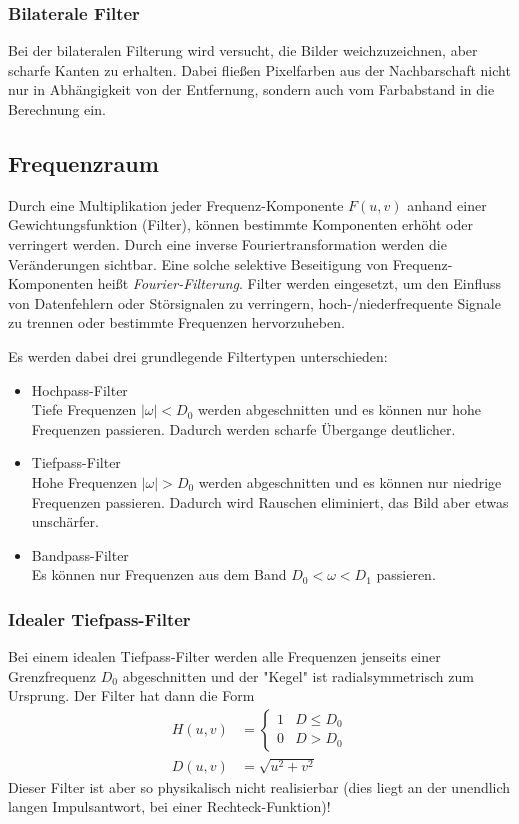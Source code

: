 	\subsubsection{Bilaterale Filter}
		Bei der bilateralen Filterung wird versucht, die Bilder weichzuzeichnen, aber scharfe Kanten zu erhalten. Dabei fließen Pixelfarben aus der Nachbarschaft nicht nur in Abhängigkeit von der Entfernung, sondern auch vom Farbabstand in die Berechnung ein.

	\subsection{Frequenzraum}
		Durch eine Multiplikation jeder Frequenz-Komponente \( F(u, v) \) anhand einer Gewichtungsfunktion (Filter), können bestimmte Komponenten erhöht oder verringert werden. Durch eine inverse Fouriertransformation werden die Veränderungen sichtbar. Eine solche selektive Beseitigung von Frequenz-Komponenten heißt \emph{Fourier-Filterung}. Filter werden \bspw eingesetzt, um den Einfluss von Datenfehlern oder Störsignalen zu verringern, hoch-/niederfrequente Signale zu trennen oder bestimmte Frequenzen hervorzuheben.

		Es werden dabei drei grundlegende Filtertypen unterschieden:
		\begin{itemize}
			\item Hochpass-Filter \\ Tiefe Frequenzen \( \lvert \omega \rvert < D_0 \) werden abgeschnitten und es können nur hohe Frequenzen passieren. Dadurch werden scharfe Übergange deutlicher.
			\item Tiefpass-Filter \\ Hohe Frequenzen \( \lvert \omega \rvert > D_0 \) werden abgeschnitten und es können nur niedrige Frequenzen passieren. Dadurch wird Rauschen eliminiert, das Bild aber etwas unschärfer.
			\item Bandpass-Filter \\ Es können nur Frequenzen aus dem Band \( D_0 < \omega < D_1 \) passieren.
		\end{itemize}

		\subsubsection{Idealer Tiefpass-Filter}
			Bei einem idealen Tiefpass-Filter werden alle Frequenzen jenseits einer Grenzfrequenz \( D_0 \) abgeschnitten und der "Kegel" ist radialsymmetrisch zum Ursprung. Der Filter hat dann die Form
			\begin{align*}
				H(u, v) & =
				\begin{cases}
					1 & D \leq D_0 \\
					0 & D > D_0
				\end{cases}               \\
				D(u, v) & = \sqrt{u^2 + v^2}
			\end{align*}
			Dieser Filter ist aber so physikalisch nicht realisierbar (dies liegt an der unendlich langen Impulsantwort, \zB bei einer Rechteck-Funktion)!

